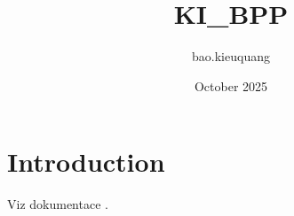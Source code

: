 \documentclass[a4paper,12pt]{article}
\title{KI\_BPP}
\author{bao.kieuquang}
\date{October 2025}
\begin{document}
\maketitle

\section{Introduction}
Viz dokumentace \cite{microsoft_entra,microsoft_intune,microsoft_edu}.

\printbibliography[title={Literatura}]
\end{document}

